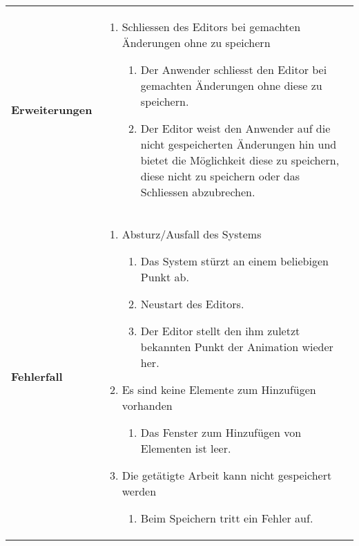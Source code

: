 \begin{longtabu}{p{0.5\textwidth}p{0.5\textwidth}}
    \cmidrule(r){1-1}\cmidrule(lr){2-2}
        \textbf{Erweiterungen} &
        \begin{enumerate}[label= (\alph*)]
            \item{Schliessen des Editors bei gemachten Änderungen ohne zu
                    speichern
                \begin{enumerate}[label= (\roman*)]
                    \item{Der Anwender schliesst den Editor bei gemachten
                            Änderungen ohne diese zu speichern.}
                    \item{Der Editor weist den Anwender auf die
                            nicht gespeicherten Änderungen hin und bietet
                            die Möglichkeit diese zu speichern, diese nicht
                            zu speichern oder das Schliessen abzubrechen.}
                \end{enumerate}
            }
        \end{enumerate}\\
    \cmidrule(r){1-1}\cmidrule(lr){2-2}
        \textbf{Fehlerfall} &
        \begin{enumerate}[label= (\alph*)]
            \item{Absturz/Ausfall des Systems
                \begin{enumerate}[label= (\roman*)]
                        \item{Das System stürzt an einem beliebigen Punkt
                                ab.}
                        \item{Neustart des Editors.}
                        \item{Der Editor stellt den ihm zuletzt bekannten
                                Punkt der Animation wieder her.}
                \end{enumerate}
            }
            \item{Es sind keine Elemente zum Hinzufügen vorhanden
                \begin{enumerate}[label= (\roman*)]
                    \item{Das Fenster zum Hinzufügen von Elementen ist leer.}
                \end{enumerate}
            }
            \item{Die getätigte Arbeit kann nicht gespeichert werden
                \begin{enumerate}[label= (\roman*)]
                    \item{Beim Speichern tritt ein Fehler auf.}

\end{enumerate}}
\end{enumerate}
\end{longtabu}
